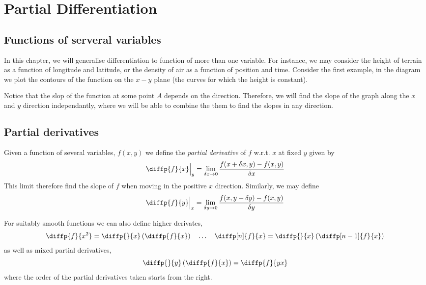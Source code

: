 \documentclass{article}
\begin{document}
\section{Partial Differentiation}
\subsection{Functions of serveral variables}
In this chapter, we will generalise differentiation to function of more than one variable. For instance, we may consider the height of terrain as a function of longitude and latitude, or the density of air as a function of position and time. 
Consider the first example, in the diagram we plot the contours of the function on the $x-y$ plane (the curves for which the height is constant).

Notice that the slop of the function at some point $A$ depends on the direction. Therefore, we will find the slope of the graph along the $x$ and $y$ direction independantly, where we will be able to combine the them to find the slopes in any direction.
\subsection{Partial derivatives}
\begin{defi}
    Given a function of several variables, $f(x, y)$ we define the \emph{partial derivative} of $f$ w.r.t. $x$ at fixed $y$ given by
    \[
        \diffp{f}{x} \Big{|}_{y} = \lim_{\delta x \rightarrow 0}{\frac{f(x + \delta x, y) - f(x, y)}{\delta x}} 
    \]
    This limit therefore find the slope of $f$ when moving in the positive $x$ direction. Similarly, we may define
    \[
        \diffp{f}{y} \Big{|}_{x} = \lim_{\delta y \rightarrow 0}{\frac{f(x, y + \delta y) - f(x, y)}{\delta y}} 
    \]
\end{defi}

\begin{remark}
    For suitably smooth functions we can also define higher derivates,
    \[
        \diffp{f}{{x^2}} = \diffp{}{x}\bkt{\diffp{f}{x}} \quad \ldots \quad \diffp[n]{f}{x} = \diffp{}{x}\bkt{\diffp[n-1]{f}{x}}
    \]
    as well as mixed partial derivatives,
    \[
        \diffp{}{y}\bkt{\diffp{f}{x}} = \diffp{f}{{y}{x}}
    \]
    where the order of the partial derivatives taken starts from the right.
\end{remark}
\end{document}
